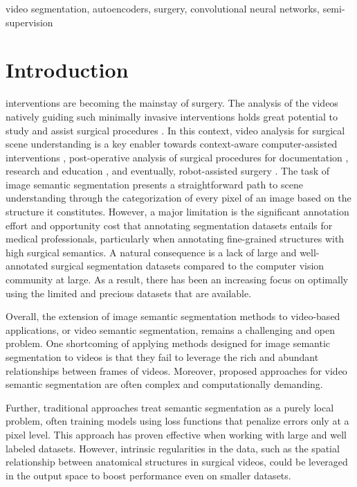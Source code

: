 \documentclass[twoside, print]{ieeecolor_arxiv}
\begin{document}
\begin{IEEEkeywords}
video segmentation, autoencoders, surgery, convolutional neural networks, semi-supervision
\end{IEEEkeywords}

\section{Introduction}
\label{sec:introduction}
     interventions are becoming the mainstay of surgery. The analysis of the videos natively guiding such minimally invasive interventions holds great potential to study and assist surgical procedures \cite{mascagni2021or}. In this context, video analysis for surgical scene understanding is a key enabler towards context-aware computer-assisted interventions \cite{vercauteren2019cai4cai}, post-operative analysis of surgical procedures for documentation \cite{mascagni2021computer}, research and education \cite{ward2021surgical}, and eventually, robot-assisted surgery \cite{kennedy2020computer}. The task of image semantic segmentation presents a straightforward path to scene understanding through the categorization of every pixel of an image based on the structure it constitutes. However, a major limitation is the significant annotation effort and opportunity cost that annotating segmentation datasets entails for medical professionals, particularly when annotating fine-grained structures with high surgical semantics. A natural consequence is a lack of large and well-annotated surgical segmentation datasets compared to the computer vision community at large. As a result, there has been an increasing focus on optimally using the limited and precious datasets that are available.



Overall, the extension of image semantic segmentation methods to video-based applications, or video semantic segmentation, remains a challenging and open problem. One shortcoming of applying methods designed for image semantic segmentation to videos is that they fail to leverage the rich and abundant relationships between frames of videos. Moreover, proposed approaches for video semantic segmentation are often complex and computationally demanding. 

Further, traditional approaches treat semantic segmentation as a purely local problem, often training models using loss functions that penalize errors only at a pixel level. This approach has proven effective when working with large and well labeled datasets. However, intrinsic regularities in the data, such as the spatial relationship between anatomical structures in surgical videos, could be leveraged in the output space to boost performance even on smaller datasets.
\end{document}
